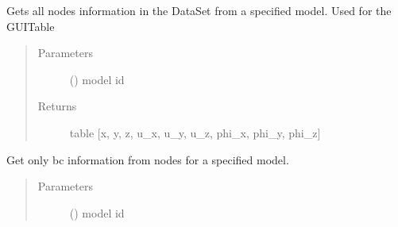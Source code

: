 \documentclass[letterpaper,10pt,english]{sphinxmanual}
\begin{document}
\begin{fulllineitems}
\begin{fulllineitems}
\begin{quote}
\begin{description}
\end{description}\end{quote}

\end{fulllineitems}


\begin{fulllineitems}
\label{\detokenize{api:beamon.database.database.Database.get_all_nodes}}
Gets all nodes information in the DataSet from a specified model. Used for the GUI\sphinxhyphen{}Table
\begin{quote}\begin{description}
\item[{Parameters}] \leavevmode
{} () \textendash{} model id

\item[{Returns}] \leavevmode
table {[}x, y, z, u\_x, u\_y, u\_z, phi\_x, phi\_y, phi\_z{]}

\end{description}\end{quote}

\end{fulllineitems}


\begin{fulllineitems}
\label{\detokenize{api:beamon.database.database.Database.get_bc}}
Get only bc information from nodes for a specified model.
\begin{quote}\begin{description}
\item[{Parameters}] \leavevmode
{} () \textendash{} model id


\end{description}
\end{quote}
\end{fulllineitems}
\end{fulllineitems}
\end{document}
